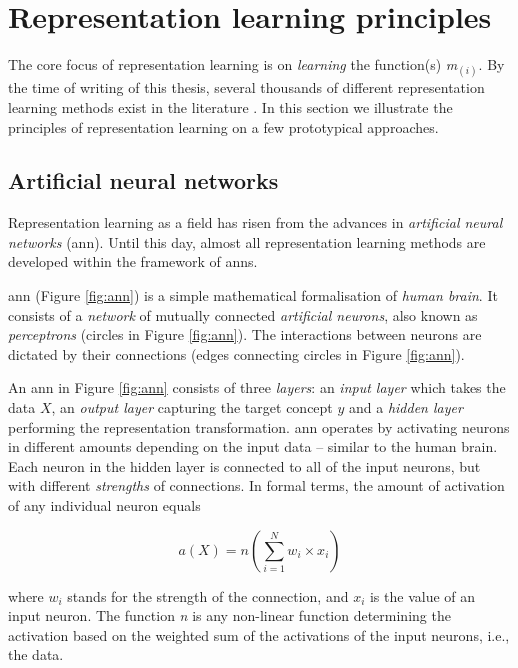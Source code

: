 \section{Representation learning principles}


The core focus of representation learning is on \textit{learning} the function(s) \textit{m}$_{(i)}$.
By the time of writing of this thesis, several thousands of different representation learning methods exist in the literature \cite{Goodfellow2016}.
In this section we illustrate the principles of representation learning on a few prototypical approaches.


\subsection{Artificial neural networks}



Representation learning as a field has risen from the advances in \textit{artificial neural networks} (\gls{ann}).
Until this day, almost all representation learning methods are developed within the framework of \gls{ann}s.


\gls{ann} (Figure \ref{fig:ann}) is a simple mathematical formalisation of \textit{human brain}.
It consists of a \textit{network} of mutually connected \textit{artificial neurons}, also known as \textit{perceptrons} (circles in Figure \ref{fig:ann}).
The interactions between neurons are dictated by their connections (edges connecting circles in Figure \ref{fig:ann}).


An \gls{ann} in Figure \ref{fig:ann} consists of three \textit{layers}: an \textit{input layer} which takes the data $X$, an \textit{output layer} capturing the target concept $y$ and a \textit{hidden layer} performing the representation transformation.
\gls{ann} operates by activating neurons in different amounts depending on the input data -- similar to the human brain.
Each neuron in the hidden layer is connected to all of the input neurons, but with different \textit{strengths} of connections.
In formal terms, the amount of activation of any individual neuron equals

\begin{equation}
	a(X) = n(\sum_{i=1}^N w_i \times x_i)
\end{equation} 

where $w_i$ stands for the strength of the connection, and $x_i$ is the value of an input neuron.
The function \textit{n} is any non-linear function determining the activation based on the weighted sum of the activations of the input neurons, i.e., the data.




